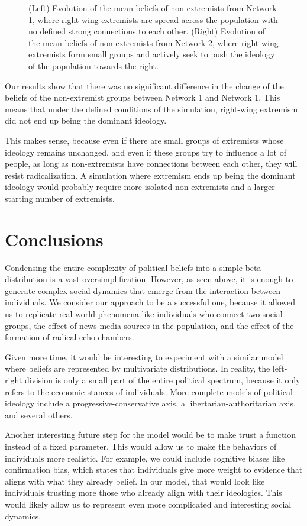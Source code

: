 \documentclass[11pt]{article}
\begin{document}
\begin{figure}[h]
    \caption{(Left) Evolution of the mean beliefs of non-extremists from Network 1, where right-wing extremists are spread across the population with no defined strong connections to each other. (Right) Evolution of the mean beliefs of non-extremists from Network 2, where right-wing extremists form small groups and actively seek to push the ideology of the population towards the right. }
\end{figure}

Our results show that there was no significant difference in the change of the beliefs of the non-extremist groups between Network 1 and Network 1. This means that under the defined conditions of the simulation, right-wing extremism did not end up being the dominant ideology. 

This makes sense, because even if there are small groups of extremists whose ideology remains unchanged, and even if these groups try to influence a lot of people, as long as non-extremists have connections between each other, they will resist radicalization. A simulation where extremism ends up being the dominant ideology would probably require more isolated non-extremists and a larger starting number of extremists.

\section{Conclusions}

Condensing the entire complexity of political beliefs into a simple beta distribution is a vast oversimplification. However, as seen above, it is enough to generate complex social dynamics that emerge from the interaction between individuals. We consider our approach to be a successful one, because it allowed us to replicate real-world phenomena like individuals who connect two social groups, the effect of news media sources in the population, and the effect of the formation of radical echo chambers.

Given more time, it would be interesting to experiment with a similar model where beliefs are represented by multivariate distributions. In reality, the left-right division is only a small part of the entire political spectrum, because it only refers to the economic stances of individuals. More complete models of political ideology include a progressive-conservative axis, a libertarian-authoritarian axis, and several others. 

Another interesting future step for the model would be to make trust a function instead of a fixed parameter. This would allow us to make the behaviors of individuals more realistic. For example, we could include cognitive biases like confirmation bias, which states that individuals give more weight to evidence that aligns with what they already belief. In our model, that would look like individuals trusting more those who already align with their ideologies. This would likely allow us to represent even more complicated and interesting social dynamics.
\end{document}
